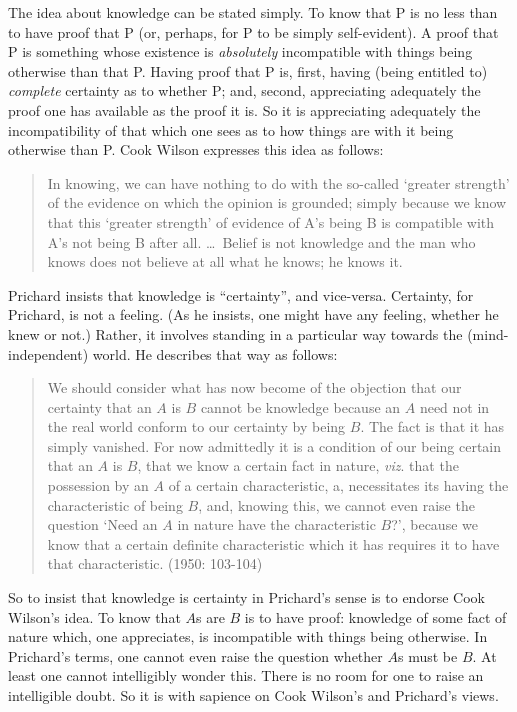 The idea about knowledge can be stated simply. To know that P is no less than to have proof that P (or, perhaps, for P to be simply self-evident). A proof that P is something whose existence is \emph{absolutely} incompatible with things being otherwise than that P. Having proof that P is, first, having (being entitled to) \emph{complete} certainty as to whether P; and, second, appreciating adequately the proof one has available as the proof it is. So it is appreciating adequately the incompatibility of that which one sees as to how things are with it being otherwise than P. Cook Wilson expresses this idea as follows:
\begin{quote}
	In knowing, we can have nothing to do with the so-called `greater strength' of the evidence on which the opinion is grounded; simply because we know that this `greater strength' of evidence of A's being B is compatible with A's not being B after all. \ldots\ Belief is not knowledge and the man who knows does not believe at all what he knows; he knows it. \citep[100]{Cook-Wilson:1926sf}
\end{quote}
Prichard insists that knowledge is ``certainty'', and vice-versa. Certainty, for Prichard, is not a feeling. (As he insists, one might have any feeling, whether he knew or not.) Rather, it involves standing in a particular way towards the (mind-independent) world. He describes that way as follows:
\begin{quote}
	We should consider what has now become of the objection that our certainty that an \( A \) is \( B \) cannot be knowledge because an \( A \) need not in the real world conform to our certainty by being \( B \). The fact is that it has simply vanished. For now admittedly it is a condition of our being certain that an \( A \) is \( B \), that we know a certain fact in nature, \emph{viz}. that the possession by an \( A \) of a certain characteristic, a, necessitates its having the characteristic of being \( B \), and, knowing this, we cannot even raise the question `Need an \( A \) in nature have the characteristic \( B \)?', because we know that a certain definite characteristic which it has requires it to have that characteristic. (1950: 103-104)
\end{quote}
So to insist that knowledge is certainty in Prichard's sense is to endorse Cook Wilson's idea. To know that \( A \)s are \( B \) is to have proof: knowledge of some fact of nature which, one appreciates, is incompatible with things being otherwise. In Prichard's terms, one cannot even raise the question whether \( A \)s must be \( B \). At least one cannot intelligibly wonder this. There is no room for one to raise an intelligible doubt. So it is with sapience on Cook Wilson’s and Prichard's views.

